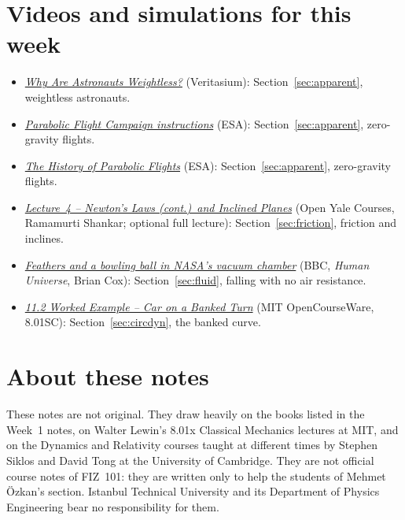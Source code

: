 \documentclass[11pt,a4paper]{article}
\begin{document}
\section*{Videos and simulations for this week}
\begin{itemize}[nosep]
\item \href{https://www.youtube.com/watch?v=iQOHRKKNNLQ}{\emph{Why Are Astronauts Weightless?}}
  (Veritasium): Section~\ref{sec:apparent}, weightless astronauts.
\item \href{https://www.esa.int/ESA_Multimedia/Videos/2024/09/Parabolic_Flight_Campaign_instructions}{\emph{Parabolic
  Flight Campaign instructions}} (ESA): Section~\ref{sec:apparent}, zero-gravity flights.
\item \href{https://www.esa.int/ESA_Multimedia/Videos/2002/05/The_History_of_Parabolic_Flights}{\emph{The
  History of Parabolic Flights}} (ESA): Section~\ref{sec:apparent}, zero-gravity flights.
\item \href{https://oyc.yale.edu/physics/phys-200/lecture-4}{\emph{Lecture~4 -- Newton's Laws
  (cont.)\ and Inclined Planes}} (Open Yale Courses, Ramamurti Shankar; optional full lecture):
  Section~\ref{sec:friction}, friction and inclines.
\item \href{https://www.youtube.com/watch?v=E43-CfukEgs}{\emph{Feathers and a bowling ball in
  NASA's vacuum chamber}} (BBC, \emph{Human Universe}, Brian Cox): Section~\ref{sec:fluid}, falling
  with no air resistance.
\item \href{https://ocw.mit.edu/courses/8-01sc-classical-mechanics-fall-2016/pages/week-3-circular-motion/11-2-worked-example-car-on-a-banked-turn/}{\emph{11.2
  Worked Example -- Car on a Banked Turn}} (MIT OpenCourseWare, 8.01SC): Section~\ref{sec:circdyn},
  the banked curve.
\end{itemize}

\section*{About these notes}
These notes are not original. They draw heavily on the books listed in the Week~1 notes, on Walter Lewin's 8.01x Classical Mechanics lectures at MIT, and on the Dynamics and Relativity courses taught at different times by Stephen Siklos and David Tong at the University of Cambridge. They are not official course notes of FIZ~101: they are written only to help the students of Mehmet \"Ozkan's section. Istanbul Technical University and its Department of Physics Engineering bear no responsibility for them.
\end{document}
